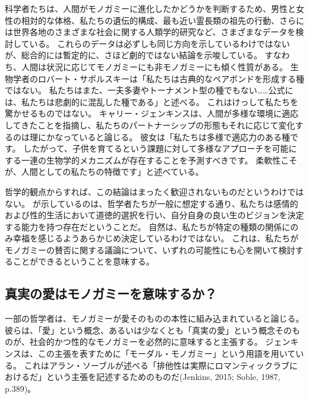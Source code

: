 \documentclass[paper=a4,book,openany]{jlreq}
\begin{document}
科学者たちは、人間がモノガミーに進化したかどうかを判断するため、男性と女性の相対的な体格、私たちの遺伝的構成、最も近い霊長類の祖先の行動、さらには世界各地のさまざまな社会に関する人類学的研究など、さまざまなデータを検討している。
これらのデータは必ずしも同じ方向を示しているわけではないが、総合的には暫定的に、さほど劇的ではない結論を示唆している。
すなわち、人間は状況に応じてモノガミーにも非モノガミーにも傾く性質がある。
生物学者のロバート・サポルスキーは「私たちは古典的なペアボンドを形成する種ではない。
私たちはまた、一夫多妻やトーナメント型の種でもない……公式には、私たちは悲劇的に混乱した種である」と述べる\citep{sapolsky25:_biolog_human_behav}。
これはけっして私たちを驚かせるものではない。
キャリー・ジェンキンスは、人間が多様な環境に適応してきたことを指摘し、私たちのパートナーシップの形態もそれに応じて変化するのは理にかなっていると論じる。
彼女は「私たちは多様で適応力のある種です。
したがって、子供を育てるという課題に対して多様なアプローチを可能にする一連の生物学的メカニズムが存在することを予測すべきです。
柔軟性こそが、人間としての私たちの特徴です」と述べている\citep{dominus17:_is_open_marriag_happier_marriag}。

哲学的観点からすれば、この結論はまったく歓迎されないものだというわけではない。
が示しているのは、哲学者たちが一般に想定する通り、私たちは感情的および性的生活において道徳的選択を行い、自分自身の良い生のビジョンを決定する能力を持つ存在だということだ。
自然は、私たちが特定の種類の関係にのみ幸福を感じるようあらかじめ決定しているわけではない。
これは、私たちがモノガミーの賛否に関する議論について、いずれの可能性にも心を開いて検討することができるということを意味する。

\subsection{真実の愛はモノガミーを意味するか？}

一部の哲学者は、モノガミーが愛そのものの本性に組み込まれていると論じる。
彼らは、「愛」という概念、あるいは少なくとも「真実の愛」という概念そのものが、社会的かつ性的なモノガミーを必然的に意味すると主張する\citep{mckeever17:_is_requir_sexual_exclus_consis_roman_love}。
ジェンキンスは、この主張を表すために「モーダル・モノガミー」という用語を用いている。
これはアラン・ソーブルが述べる「排他性は実際にロマンティックラブにおけるだ」という主張を記述するためのものだ(Jenkins, 2015; Soble, 1987, p.389)。
\nocite{jenkins15:_modal_monog}\nocite{soble87:_unity_roman_love}
\end{document}
